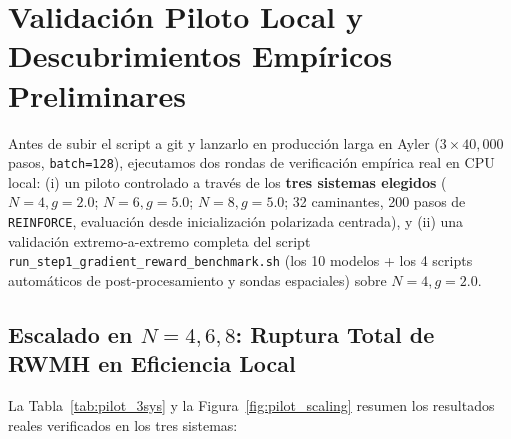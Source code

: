 \documentclass[10pt,a4paper]{article}
\begin{document}
\section{Validación Piloto Local y Descubrimientos Empíricos Preliminares}
\label{sec:pilot}

Antes de subir el script a git y lanzarlo en producción larga en Ayler ($3\times 40{,}000$ pasos, \texttt{batch=128}), ejecutamos dos rondas de verificación empírica real en CPU local: (i) un piloto controlado a través de los \textbf{tres sistemas elegidos} ($N=4, g=2.0$; $N=6, g=5.0$; $N=8, g=5.0$; 32 caminantes, 200 pasos de \texttt{REINFORCE}, evaluación desde inicialización polarizada centrada), y (ii) una validación extremo-a-extremo completa del script \texttt{run\_step1\_gradient\_reward\_benchmark.sh} (los 10 modelos + los 4 scripts automáticos de post-procesamiento y sondas espaciales) sobre $N=4, g=2.0$.

\subsection{Escalado en \texorpdfstring{$N=4, 6, 8$}{N=4, 6, 8}: Ruptura Total de RWMH en Eficiencia Local}

La Tabla~\ref{tab:pilot_3sys} y la Figura~\ref{fig:pilot_scaling} resumen los resultados reales verificados en los tres sistemas:
\end{document}
